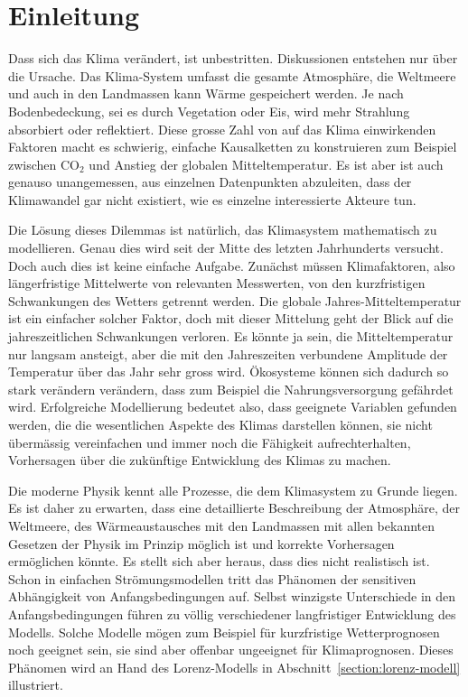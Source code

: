 %
%
%
\chapter*{Einleitung\label{chapter:einleitung}}
Dass sich das Klima verändert, ist unbestritten.
Diskussionen entstehen nur über die Ursache.
Das Klima-System umfasst die gesamte Atmosphäre, die Weltmeere und auch in
den Landmassen kann Wärme gespeichert werden.
Je nach Bodenbedeckung, sei es durch Vegetation oder Eis, wird mehr
Strahlung absorbiert oder reflektiert.
Diese grosse Zahl von auf das Klima einwirkenden Faktoren macht es
schwierig, einfache Kausalketten zu konstruieren zum Beispiel zwischen
$\text{CO}_2$ und Anstieg der globalen Mitteltemperatur.
Es ist aber ist auch genauso unangemessen, aus einzelnen Datenpunkten 
abzuleiten, dass der Klimawandel gar nicht existiert, wie es einzelne
interessierte Akteure tun.

Die Lösung dieses Dilemmas ist natürlich, das Klimasystem mathematisch
zu modellieren.
Genau dies wird seit der Mitte des letzten Jahrhunderts versucht.
Doch auch dies ist keine einfache Aufgabe.
Zunächst müssen Klimafaktoren, also längerfristige Mittelwerte
von relevanten Messwerten, von den kurzfristigen Schwankungen des
Wetters getrennt werden.
Die globale Jahres-Mitteltemperatur ist ein einfacher solcher Faktor,
doch mit dieser Mittelung geht der Blick auf die jahreszeitlichen
Schwankungen verloren. 
Es könnte ja sein, die Mitteltemperatur nur langsam ansteigt, aber die
mit den Jahreszeiten verbundene Amplitude der Temperatur über das Jahr
sehr gross wird.
Ökosysteme können sich dadurch so stark verändern verändern, dass zum
Beispiel die Nahrungsversorgung gefährdet wird.
Erfolgreiche Modellierung bedeutet also, dass geeignete Variablen 
gefunden werden, die die wesentlichen Aspekte des Klimas darstellen
können, sie nicht übermässig vereinfachen und immer noch die Fähigkeit
aufrechterhalten, Vorhersagen über die zukünftige Entwicklung des Klimas 
zu machen.

Die moderne Physik kennt alle Prozesse, die dem Klimasystem zu Grunde
liegen.
Es ist daher zu erwarten, dass eine detaillierte Beschreibung der Atmosphäre,
der Weltmeere, des Wärmeaustausches mit den Landmassen mit allen bekannten
Gesetzen der Physik im Prinzip möglich ist und korrekte Vorhersagen
ermöglichen könnte.
Es stellt sich aber heraus, dass dies nicht realistisch ist.
Schon in einfachen Strömungsmodellen tritt das Phänomen der sensitiven
Abhängigkeit von Anfangsbedingungen auf.
Selbst winzigste Unterschiede in den Anfangsbedingungen führen zu völlig
verschiedener langfristiger Entwicklung des Modells.
Solche Modelle mögen zum Beispiel für kurzfristige Wetterprognosen
noch geeignet sein, sie sind aber offenbar ungeeignet für Klimaprognosen.
Dieses Phänomen wird an Hand des Lorenz-Modells in
Abschnitt~\ref{section:lorenz-modell} illustriert.

